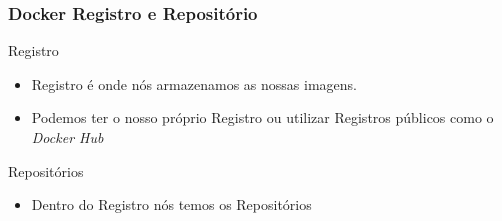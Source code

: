 \documentclass[12pt]{beamer}
\begin{document}
\begin{frame}
  \frametitle{Docker Registro e Repositório}
	\begin{block}{Registro}
		\begin{itemize}
			\item Registro é onde nós armazenamos as nossas imagens.
			\pause
			\item Podemos ter o nosso próprio Registro ou utilizar Registros públicos
							como o \emph{Docker Hub}
		\end{itemize}
	\end{block}
	\begin{block}{Repositórios}
		\begin{itemize}
			\item Dentro do Registro nós temos os Repositórios
		\end{itemize}
	\end{block}
\end{frame}
\end{document}
